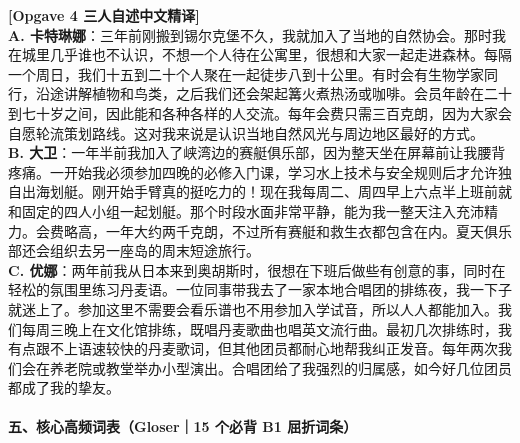 \begin{transbox}
\small
\textbf{\color{NCDTeal}[Opgave 4 三人自述中文精译]}\\
\textbf{A. 卡特琳娜}：三年前刚搬到锡尔克堡不久，我就加入了当地的自然协会。那时我在城里几乎谁也不认识，不想一个人待在公寓里，很想和大家一起走进森林。每隔一个周日，我们十五到二十个人聚在一起徒步八到十公里。有时会有生物学家同行，沿途讲解植物和鸟类，之后我们还会架起篝火煮热汤或咖啡。会员年龄在二十到七十岁之间，因此能和各种各样的人交流。每年会费只需三百克朗，因为大家会自愿轮流策划路线。这对我来说是认识当地自然风光与周边地区最好的方式。\\
\textbf{B. 大卫}：一年半前我加入了峡湾边的赛艇俱乐部，因为整天坐在屏幕前让我腰背疼痛。一开始我必须参加四晚的必修入门课，学习水上技术与安全规则后才允许独自出海划艇。刚开始手臂真的挺吃力的！现在我每周二、周四早上六点半上班前就和固定的四人小组一起划艇。那个时段水面非常平静，能为我一整天注入充沛精力。会费略高，一年大约两千克朗，不过所有赛艇和救生衣都包含在内。夏天俱乐部还会组织去另一座岛的周末短途旅行。\\
\textbf{C. 优娜}：两年前我从日本来到奥胡斯时，很想在下班后做些有创意的事，同时在轻松的氛围里练习丹麦语。一位同事带我去了一家本地合唱团的排练夜，我一下子就迷上了。参加这里不需要会看乐谱也不用参加入学试音，所以人人都能加入。我们每周三晚上在文化馆排练，既唱丹麦歌曲也唱英文流行曲。最初几次排练时，我有点跟不上语速较快的丹麦歌词，但其他团员都耐心地帮我纠正发音。每年两次我们会在养老院或教堂举办小型演出。合唱团给了我强烈的归属感，如今好几位团员都成了我的挚友。
\end{transbox}

\paragraph*{五、核心高频词表（Gloser｜15 个必背 B1 屈折词条）}


